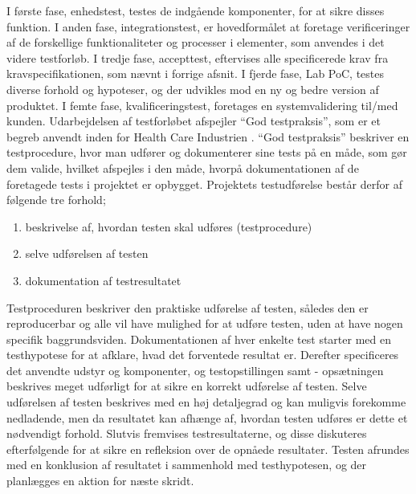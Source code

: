 I første fase, enhedstest, testes de indgående komponenter, for at sikre disses funktion. I anden fase, integrationstest, er hovedformålet at foretage verificeringer af de forskellige funktionaliteter og processer i elementer, som anvendes i det videre testforløb. I tredje fase, accepttest, eftervises alle specificerede krav fra kravspecifikationen, som nævnt i forrige afsnit. I fjerde fase, Lab PoC, testes diverse forhold og hypoteser, og der udvikles mod en ny og bedre version af produktet. I femte fase, kvalificeringstest, foretages en systemvalidering til/med kunden. 
Udarbejdelsen af testforløbet afspejler “God testpraksis”, som er et begreb anvendt inden for Health Care Industrien \citep{RefWorks:29}. “God testpraksis” beskriver en testprocedure, hvor man udfører og dokumenterer sine tests på en måde, som gør dem valide, hvilket afspejles i den måde, hvorpå dokumentationen af de foretagede tests i projektet er opbygget. Projektets testudførelse består derfor af følgende tre forhold;

\begin{enumerate}
	\item beskrivelse af, hvordan testen skal udføres (testprocedure) 
	\item selve udførelsen af testen 
	\item dokumentation af testresultatet
	\end{enumerate}

Testproceduren beskriver den praktiske udførelse af testen, således den er reproducerbar og alle vil have mulighed for at udføre testen, uden at have nogen specifik baggrundsviden. Dokumentationen af hver enkelte test starter med en testhypotese for at afklare, hvad det forventede resultat er. Derefter specificeres det anvendte udstyr og komponenter, og testopstillingen samt - opsætningen beskrives meget udførligt for at sikre en korrekt udførelse af testen. Selve udførelsen af testen beskrives med en høj detaljegrad og kan muligvis forekomme nedladende, men da resultatet kan afhænge af, hvordan testen udføres er dette et nødvendigt forhold. Slutvis fremvises testresultaterne, og disse diskuteres efterfølgende for at sikre en refleksion over de opnåede resultater. Testen afrundes med en konklusion af resultatet i sammenhold med testhypotesen, og der planlægges en aktion for næste skridt. 
	
